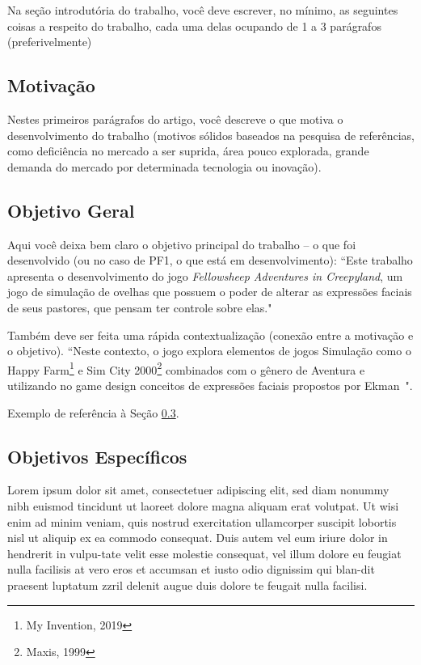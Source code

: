 Na seção introdutória do trabalho, você deve escrever, no mínimo, as seguintes coisas a respeito do trabalho, cada uma delas ocupando de 1 a 3 parágrafos (preferivelmente) 

\subsection{Motivação}
\label{secao:motivacao}
Nestes primeiros parágrafos do artigo, você descreve o que motiva o desenvolvimento do trabalho (motivos sólidos baseados na pesquisa de referências, como deficiência no mercado a ser suprida, área pouco explorada, grande demanda do mercado por determinada tecnologia ou inovação).  

\subsection{Objetivo Geral}
\label{secao:objetivo_geral}
Aqui você deixa bem claro o objetivo principal do trabalho -- o que foi desenvolvido (ou no caso de PF1, o que está em desenvolvimento): ``Este trabalho apresenta o desenvolvimento do jogo \emph{Fellowsheep Adventures in Creepyland}, um jogo de simulação de ovelhas que possuem o poder de alterar as expressões faciais de seus pastores, que pensam ter controle sobre elas." 

Também deve ser feita uma rápida contextualização (conexão entre a motivação e o objetivo). ``Neste contexto, o jogo explora elementos de jogos Simulação como o Happy Farm\footnote{My Invention, 2019} e Sim City 2000\footnote{Maxis, 1999} combinados com o gênero de Aventura e utilizando no game design conceitos de expressões faciais propostos por Ekman~\cite{Ekman:1978}".

Exemplo de referência à Seção \ref{secao:objetivos_especificos}.

\subsection{Objetivos Específicos}
\label{secao:objetivos_especificos}
Lorem ipsum dolor sit amet, consectetuer adipiscing elit, sed diam nonummy nibh euismod tincidunt ut laoreet dolore magna aliquam erat volutpat. Ut wisi enim ad minim veniam, quis nostrud exercitation ullamcorper suscipit lobortis nisl ut aliquip ex ea commodo consequat. Duis autem vel eum iriure dolor in hendrerit in vulpu-tate velit esse molestie consequat, vel illum dolore eu feugiat nulla facilisis at vero eros et accumsan et iusto odio dignissim qui blan-dit praesent luptatum zzril delenit augue duis dolore te feugait nulla facilisi.


